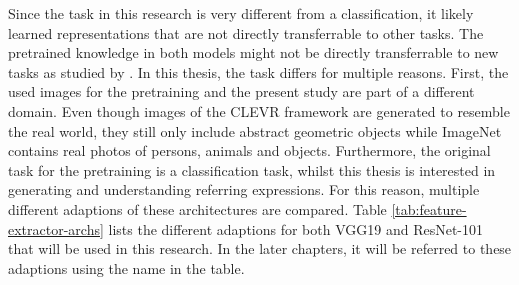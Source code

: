 Since the task in this research is very different from a classification, it likely learned representations that are not directly transferrable to other tasks.
The pretrained knowledge in both models might not be directly transferrable to new tasks as studied by \citet{Yosinski2014}.
In this thesis, the task differs for multiple reasons.
First, the used images for the pretraining and the present study are part of a different domain.
Even though images of the CLEVR framework are generated to resemble the real world, they still only include abstract geometric objects while ImageNet contains real photos of persons, animals and objects.
Furthermore, the original task for the pretraining is a classification task, whilst this thesis is interested in generating and understanding referring expressions.
For this reason, multiple different adaptions of these architectures are compared.
Table \ref{tab:feature-extractor-archs} lists the different adaptions for both VGG19 and ResNet-101 that will be used in this research.
In the later chapters, it will be referred to these adaptions using the name in the table.

